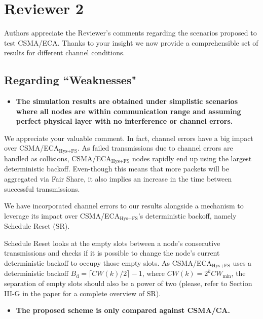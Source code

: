 \documentclass[]{article}
\begin{document}
		
		
\section{Reviewer 2}
Authors appreciate the Reviewer's comments regarding the scenarios proposed to test CSMA/ECA. Thanks to your insight we now provide a comprehensible set of results for different channel conditions.

	\subsection{Regarding ``Weaknesses"}
	\begin{itemize}
		\item {\bfseries The simulation results are obtained under simplistic scenarios where all nodes are within communication range and assuming perfect physical layer with no interference or channel errors.}
	\end{itemize}
	
	We appreciate your valuable comment. In fact, channel errors have a big impact over CSMA/ECA$_{\text{Hys+FS}}$. As failed transmissions due to channel errors are handled as collisions, CSMA/ECA$_{\text{Hys+FS}}$ nodes rapidly end up using the largest deterministic backoff. Even-though this means that more packets will be aggregated via Fair Share, it also implies an increase in the time between successful transmissions. 
	
	We have incorporated channel errors to our results alongside a mechanism to leverage its impact over CSMA/ECA$_{\text{Hys+FS}}$'s deterministic backoff, namely Schedule Reset (SR).
	
	Schedule Reset looks at the empty slots between a node's consecutive transmissions and checks if it is possible to change the node's current deterministic backoff to occupy those empty slots. As CSMA/ECA$_{\text{Hys+FS}}$ uses a deterministic backoff $B_{\text{d}}=\lceil CW(k)/2\rceil -1$, where $CW(k)=2^{k}CW_{\min}$, the separation of empty slots should also be a power of two (please, refer to Section III-G in the paper for a complete overview of SR).
	
	\begin{itemize}
		\item {\bfseries The proposed scheme is only compared against CSMA/CA.}
	\end{itemize}
\end{document}
